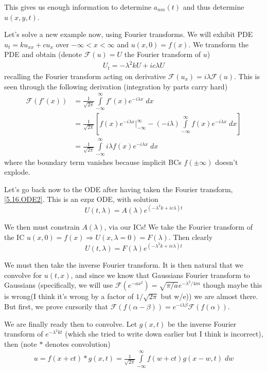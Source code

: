 \documentclass[10pt]{article}
\begin{document}
This gives us enough information to determine $a_{nm}(t)$ and thus determine $u(x,y,t)$.

Let's solve a new example now, using Fourier transforms. We will exhibit PDE $u_t = ku_{xx} + cu_x$ over $-\infty < x < \infty$ and $u(x,0) = f(x)$. We transform the PDE and obtain (denote $\mathcal{F}(u) = U$ the Fourier transform of $u$)
\begin{align}
    U_t = -\lambda^2 kU + ic\lambda U\label{5.16.ODE2}
\end{align}
recalling the Fourier transform acting on derivative $\mathcal{F}(u_x) = i\lambda \mathcal{F}(u)$. This is seen through the following derivation (integration by parts carry hard)
\begin{align}
    \mathcal{F}(f'(x)) &= \frac{1}{\sqrt{2\pi}}\int\limits_{-\infty}^{\infty}f'(x)e^{-i\lambda x}\;dx\\
    &= \frac{1}{\sqrt{2\pi}}\left[ f(x)e^{-i\lambda x}\Bigg|_{-\infty}^\infty - (-i\lambda)\int\limits_{-\infty}^{\infty}f(x)e^{-i\lambda x}\;dx \right]\\
    &= \frac{1}{\sqrt{2\pi}}\int\limits_{-\infty}^{\infty}i\lambda f(x)e^{-i\lambda x}\;dx
\end{align}
where the boundary term vanishes because implicit BCs $f(\pm \infty)$ doesn't explode. 

Let's go back now to the ODE after having taken the Fourier transform, \eqref{5.16.ODE2}. This is an ezpz ODE, with solution
\begin{equation}
    U(t,\lambda) = A(\lambda)e^{(-\lambda^2k + ic\lambda)t}
\end{equation}

We then must constrain $A(\lambda)$, via our ICs! We take the Fourier transform of the IC $u(x,0) = f(x) \Rightarrow U(x,\lambda = 0) = F(\lambda)$. Then clearly
\begin{equation}
    U(t,\lambda) = F(\lambda)e^{(-\lambda^2k + ic\lambda)t}
\end{equation}

We must then take the inverse Fourier transform. It is then natural that we convolve for $u(t,x)$, and since we know that Gaussians Fourier transform to Gaussians (specifically, we will use $\mathcal{F}(e^{-ax^2}) = \sqrt{\pi/a}e^{-\lambda^2/4m}$ though maybe this is wrong(I think it's wrong by a factor of $1/\sqrt{2\pi}$ but w/e)) we are almost there. But first, we prove cursorily that $\mathcal{F}(f(\alpha - \beta)) = e^{-i\lambda \beta}\mathcal{F}(f(\alpha))$. 

We are finally ready then to convolve. Let $g(x,t)$ be the inverse Fourier transform of $e^{-\lambda^2 kt}$ (which she tried to write down earlier but I think is incorrect), then (note $*$ denotes convolution)
\begin{align}
    u = f(x + ct)*g(x,t) = \frac{1}{\sqrt{2\pi}}\int\limits_{-\infty}^{\infty}f(w + ct) g(x-w,t)\;dw
\end{align}
\end{document}
